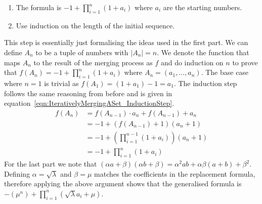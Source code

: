 \begin{parts}
	\begin{hints}
		\begin{enumerate}
			\item The formula is $-1 + \prod_{i=1}^n (1 + a_i)$ where $a_i$ are the starting numbers.
			\item Use induction on the length of the initial sequence.
		\end{enumerate}
	\end{hints}
	
	\begin{solution}
	
		This step is essentially just formalising the ideas used in the first part. We can define $A_n$ to be a tuple of numbers with $|A_n| = n$. We denote the function that maps $A_n$ to the result of the merging process as $f$ and do induction on $n$ to prove that $f(A_n) = -1 + \prod_{i=1}^n (1 + a_i)$ where $A_n = (a_1, \dots, a_n)$. The base case where $n = 1$ is trivial as $f(A_1) = (1 + a_1) - 1 = a_1$. The induction step follows the same reasoning from before and is given in equation~\eqref{eqn:IterativelyMergingASet_InductionStep}.
		\begin{equation}
			\begin{aligned}
				f(A_n) &= f(A_{n-1}) \cdot a_n + f(A_{n-1}) + a_n  \\
				&= -1 + (f(A_{n-1}) + 1)(a_n + 1)  \\
				&= -1 + \left( \prod_{i=1}^{n-1} (1 + a_i) \right)(a_n + 1)  \\
				&= -1 + \prod_{i=1}^{n} (1 + a_i)
			\end{aligned}
			\label{eqn:IterativelyMergingASet_InductionStep}
		\end{equation}
		For the last part we note that $(\alpha a + \beta)(\alpha b + \beta) = \alpha^2ab + \alpha\beta(a + b) + \beta^2$. Defining $\alpha = \sqrt{\lambda}$ and $\beta = \mu$ matches the coefficients in the replacement formula, therefore applying the above argument shows that the generalised formula is $-(\mu^n) + \prod_{i=1}^n (\sqrt{\lambda}a_i + \mu)$.
	
	\end{solution}

\end{parts}